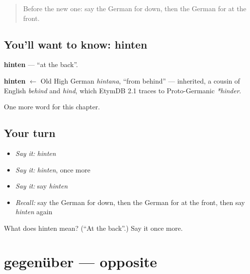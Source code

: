 \label{lesson:GE-C109-hinten}



\begin{quote}
Before the new one: say the German for down, then the German for at the front.
\end{quote}

\subsection*{You'll want to know: hinten}
\textbf{hinten} — \textquotedblleft{}at the back\textquotedblright{}.

\begin{cousinweb}
\textbf{hinten} $\leftarrow$ Old High German \emph{hintana}, \textquotedblleft{}from behind\textquotedblright{} — inherited, a cousin of English \emph{behind} and \emph{hind}, which EtymDB 2.1 traces to Proto-Germanic \emph{*hinder}.
\end{cousinweb}

\begin{grammarlens}[title={What you've built}]
One more word for this chapter.
\end{grammarlens}

\subsection*{Your turn}
\begin{itemize}
\raggedright
  \item \emph{Say it:} \emph{hinten}
  \item \emph{Say it:} \emph{hinten}, once more
  \item \emph{Say it:} say \emph{hinten}
  \item \emph{Recall:} say the German for down, then the German for at the front, then say \emph{hinten} again
\end{itemize}

\begin{tcolorbox}[breakable,colback=teal!4,colframe=teal!35!black,title={Before you move on}]
What does hinten mean? (\textquotedblleft{}At the back\textquotedblright{}.) Say it once more.
\end{tcolorbox}
\section[gegenüber]{gegenüber — opposite}

\label{lesson:GE-C109-gegenueber}



